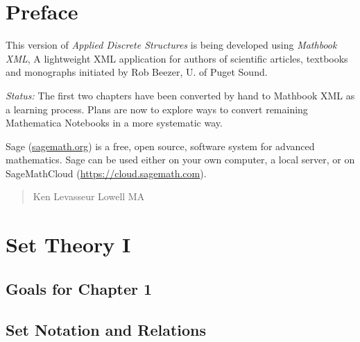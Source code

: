\documentclass[10pt,]{book}
\theoremstyle{plain}
\theoremstyle{definition}
\begin{document}
\chapter*{Preface}\label{preface-1}
This version of \emph{Applied Discrete Structures} is being developed using \emph{Mathbook XML}, A lightweight XML application for authors of scientific articles, textbooks and monographs initiated by Rob Beezer, U. of Puget Sound.  %
\par
\emph{Status:}  The first  two chapters have been converted by hand to Mathbook XML as a learning process.  Plans are now to explore ways to convert remaining Mathematica Notebooks in a more systematic way.%
\par
Sage (\href{http://sagemath.org}{sagemath.org}) is a free, open source, software system for advanced mathematics.  Sage can be used either on your own computer, a local server, or on SageMathCloud (\href{https://cloud.sagemath.com}{https://cloud.sagemath.com}). %
\begin{quote}
			Ken Levasseur \newline{}
			Lowell MA
		\end{quote}%
\setcounter{tocdepth}{1}
\renewcommand*\contentsname{Contents}
\tableofcontents
\mainmatter
\typeout{************************************************}
\typeout{************************************************}
\chapter[Set Theory I]{Set Theory I}\label{chapter-1}
\typeout{************************************************}
\typeout{************************************************}
\section*{Goals for Chapter 1}
\typeout{************************************************}
\typeout{************************************************}
\section[Set Notation and Relations ]{Set Notation and Relations }\label{Set-Notation-and-Relations}
\typeout{************************************************}
\typeout{************************************************}
\end{document}
